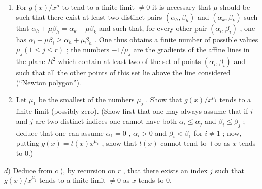 \begin{enumerate}
\def\labelenumi{\alph{enumi})}
\setcounter{enumi}{1}
\item
  For \(g(x)/x^{\mu}\) to tend to a finite limit \(\neq0\) it is necessary that \(\mu\) should be such that there exist at least two distinct pairs \((\alpha_{h},\beta_{h})\) and \((\alpha_{k},\beta_{k})\) such that \(\alpha_{h}+\mu\beta_{h}=\alpha_{k}+\mu\beta_{k}\) and such that, for every other pair \((\alpha_{i},\beta_{i})\) , one has \(\alpha_{i}+\mu\beta_{i}\geqslant\alpha_{h}+\mu\beta_{h}\) . One thus obtains a finite number of possible values \(\mu_{j}(1\leqslant j\leqslant r)\) ; the numbers \(-1/\mu_{j}\) are the gradients of the affine lines in the plane \(R^{2}\) which contain at least two of the set of points \((\alpha_{i},\beta_{i})\) and such that all the other points of this set lie above the line considered (``Newton polygon'').
\item
  Let \(\mu_{1}\) be the smallest of the numbers \(\mu_{j}\) . Show that \(g(x) / x^{\mu_1}\) tends to a finite limit (possibly zero). (Show first that one may always assume that if \(i\) and \(j\) are two distinct indices one cannot have both \(\alpha_{i} \leqslant \alpha_{j}\) and \(\beta_{i} \leqslant \beta_{j}\) ; deduce that one can assume \(\alpha_{1} = 0\) , \(\alpha_{i} > 0\) and \(\beta_{i} < \beta_{1}\) for \(i \neq 1\) ; now, putting \(g(x) = t(x)x^{\mu_1}\) , show that \(t(x)\) cannot tend to \(+\infty\) as \(x\) tends to 0.)
\end{enumerate}

\(d)\) Deduce from \(c\) ), by recursion on \(r\) , that there exists an index \(j\) such that \(g(x) / x^{\mu_j}\) tends to a finite limit \(\neq 0\) as \(x\) tends to 0.

\setcounter{exercisegroup}{2}
